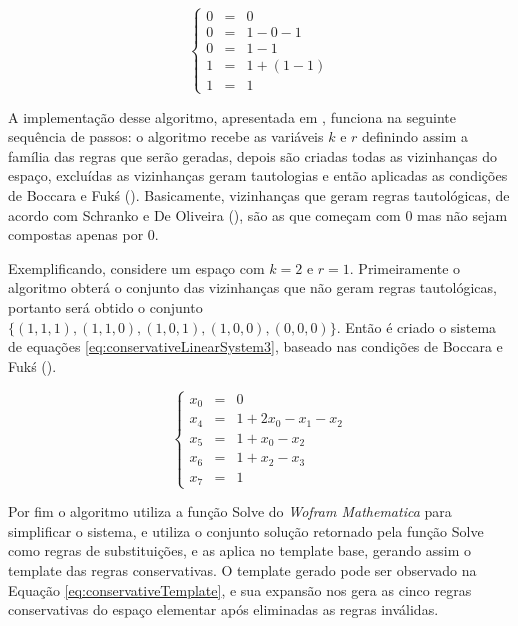 \documentclass[12pt,a4paper]{article}
\begin{document}
	\begin{equation}
	\left\{\begin{matrix}
	 0 & = & 0 \\ 
	 0 & = & 1 - 0 - 1 \\ 
	 0 & = & 1 - 1 \\ 
	 1 & = & 1 + (1 - 1)\\ 
	 1 & = & 1 
	\end{matrix}\right.
	\label{eq:conservativeAC204}
	\end{equation}

	A implementação desse algoritmo, apresentada em \cite{deOliveira2014}, funciona na seguinte sequência de passos: o algoritmo recebe as variáveis $k$ e $r$ definindo assim a família das regras que serão geradas, depois são criadas todas as vizinhanças do espaço, excluídas as vizinhanças geram tautologias e então aplicadas as condições de Boccara e Fukś (\citeyear{boccara2002}). Basicamente, vizinhanças que geram regras tautológicas, de acordo com  Schranko e De Oliveira (\citeyear{Schranko2010}), são as que começam com 0 mas não sejam compostas apenas por 0.

	Exemplificando, considere um espaço com $k=2$ e $r=1$. Primeiramente o algoritmo obterá o conjunto das vizinhanças que não geram regras tautológicas, portanto será obtido o conjunto $\{(1,1,1),(1,1,0),(1,0,1),(1,0,0),(0,0,0)\}$. Então é criado o sistema de equações \ref{eq:conservativeLinearSystem3}, baseado nas condições de Boccara e Fukś (\citeyear{boccara2002}).

	\begin{equation}
	\left\{\begin{matrix}
	 x_0 & = & 0\\ 
	 x_4 & = & 1 +2x_0 -x_1 -x_2\\ 
	 x_5 & = & 1 +x_0 -x_2\\
	 x_6 & = & 1 +x_2 -x_3\\ 
	 x_7 & = & 1
	\end{matrix}\right.
	\label{eq:conservativeLinearSystem3}
	\end{equation}

	Por fim o algoritmo utiliza a função Solve do \textit{Wofram Mathematica} para simplificar o sistema, e utiliza o conjunto solução retornado pela função Solve como regras de substituições, e as aplica no template base, gerando assim o template das regras conservativas. O template gerado pode ser observado na Equação \ref{eq:conservativeTemplate}, e sua expansão nos gera as cinco regras conservativas do espaço elementar após eliminadas as regras inválidas.
\end{document}
